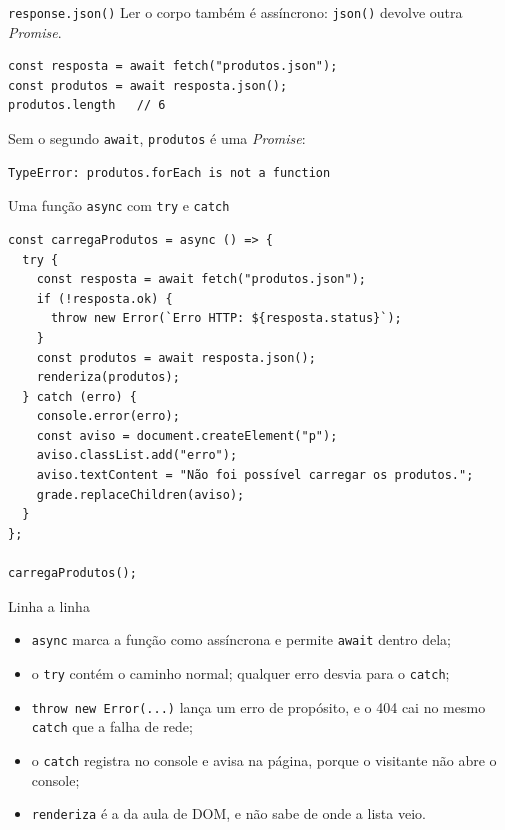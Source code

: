 \documentclass{beamer}
\begin{document}
\begin{frame}[fragile]{\texttt{response.json()}}
	Ler o corpo também é assíncrono: \texttt{json()} devolve outra
	\emph{Promise}.

	\begin{verbatim}
const resposta = await fetch("produtos.json");
const produtos = await resposta.json();
produtos.length   // 6
	\end{verbatim}

	\vspace{0.3cm}
	Sem o segundo \texttt{await}, \texttt{produtos} é uma \emph{Promise}:

	\begin{verbatim}
TypeError: produtos.forEach is not a function
	\end{verbatim}
\end{frame}

\begin{frame}[fragile]{Uma função \texttt{async} com \texttt{try} e \texttt{catch}}
	\begin{verbatim}
const carregaProdutos = async () => {
  try {
    const resposta = await fetch("produtos.json");
    if (!resposta.ok) {
      throw new Error(`Erro HTTP: ${resposta.status}`);
    }
    const produtos = await resposta.json();
    renderiza(produtos);
  } catch (erro) {
    console.error(erro);
    const aviso = document.createElement("p");
    aviso.classList.add("erro");
    aviso.textContent = "Não foi possível carregar os produtos.";
    grade.replaceChildren(aviso);
  }
};

carregaProdutos();
	\end{verbatim}
\end{frame}

\begin{frame}{Linha a linha}
	\begin{itemize}
		\item \texttt{async} marca a função como assíncrona e permite
		      \texttt{await} dentro dela;
		\item o \texttt{try} contém o caminho normal; qualquer erro desvia para o
		      \texttt{catch};
		\item \texttt{throw new Error(...)} lança um erro de propósito, e o 404
		      cai no mesmo \texttt{catch} que a falha de rede;
		\item o \texttt{catch} registra no console e avisa na página, porque o
		      visitante não abre o console;
		\item \texttt{renderiza} é a da aula de DOM, e não sabe de onde a lista
		      veio.
	\end{itemize}
\end{frame}
\end{document}
